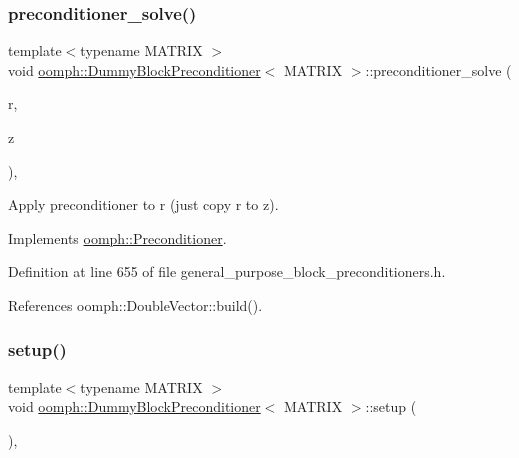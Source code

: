 \subsubsection{\texorpdfstring{preconditioner\+\_\+solve()}{preconditioner\_solve()}}
{\footnotesize\ttfamily template$<$typename M\+A\+T\+R\+IX $>$ \\
void \hyperlink{classoomph_1_1DummyBlockPreconditioner}{oomph\+::\+Dummy\+Block\+Preconditioner}$<$ M\+A\+T\+R\+IX $>$\+::preconditioner\+\_\+solve (\begin{DoxyParamCaption}\item[{const \hyperlink{classoomph_1_1DoubleVector}{Double\+Vector} \&}]{r,  }\item[{\hyperlink{classoomph_1_1DoubleVector}{Double\+Vector} \&}]{z }\end{DoxyParamCaption})\hspace{0.3cm}{\ttfamily [inline]}, {\ttfamily [virtual]}}



Apply preconditioner to r (just copy r to z). 



Implements \hyperlink{classoomph_1_1Preconditioner_ace1199369e4465cd2b9a34884bb64ec8}{oomph\+::\+Preconditioner}.



Definition at line 655 of file general\+\_\+purpose\+\_\+block\+\_\+preconditioners.\+h.



References oomph\+::\+Double\+Vector\+::build().

\mbox{\label{classoomph_1_1DummyBlockPreconditioner_a5bca747d99ecd5b18aef416fb6ad2c99}} 
\subsubsection{\texorpdfstring{setup()}{setup()}}
{\footnotesize\ttfamily template$<$typename M\+A\+T\+R\+IX $>$ \\
void \hyperlink{classoomph_1_1DummyBlockPreconditioner}{oomph\+::\+Dummy\+Block\+Preconditioner}$<$ M\+A\+T\+R\+IX $>$\+::setup (\begin{DoxyParamCaption}{ }\end{DoxyParamCaption})\hspace{0.3cm}{\ttfamily [inline]}, {\ttfamily [virtual]}}



